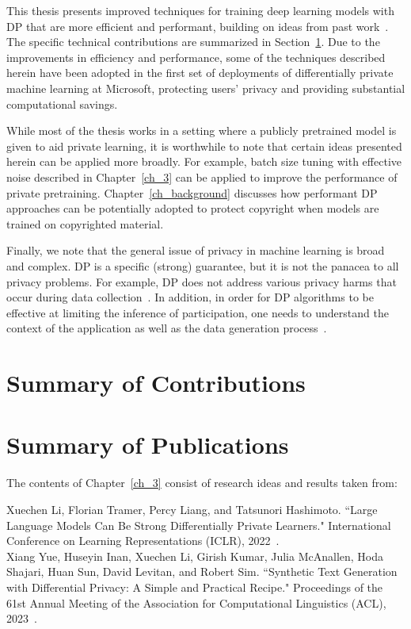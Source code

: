 This thesis presents improved techniques for training deep learning models with DP that are more efficient and performant, building on ideas from past work~\cite{abadi2016deep,tramer2020differentially}.
The specific technical contributions are summarized in Section~\ref{sec:overview_of_results}.
Due to the improvements in efficiency and performance, some of the techniques described herein have been adopted in the first set of deployments of differentially private machine learning at Microsoft, protecting users' privacy and providing substantial computational savings.

While most of the thesis works in a setting where a publicly pretrained model is given to aid private learning, it is worthwhile to note that certain ideas presented herein can be applied more broadly. 
For example, batch size tuning with effective noise described in Chapter~\ref{ch_3} can be applied to improve the performance of private pretraining. 
Chapter~\ref{ch_background} discusses how performant DP approaches can be potentially adopted to protect copyright when models are trained on copyrighted material.

Finally, we note that the general issue of privacy in machine learning is broad and complex.
DP is a specific (strong) guarantee, but it is not the panacea to all privacy problems.
For example, DP does not address various privacy harms that occur during data collection~\cite{solove2005taxonomy}.
In addition, in order for DP algorithms to be effective at limiting the inference of participation, one needs to understand the context of the application as well as the data generation process~\cite{kifer2011no}.

\section{Summary of Contributions}\label{sec:overview_of_results}

\newpage
\section{Summary of Publications}

\noindent The contents of Chapter~\ref{ch_3} consist of research ideas and results taken from:

\begin{mdframed}[leftline=true, topline=false, rightline=false, bottomline=false, linewidth=2pt]
Xuechen Li, Florian Tramer, Percy Liang, and Tatsunori Hashimoto. ``Large Language Models Can Be Strong Differentially Private Learners." International Conference on Learning Representations (ICLR), 2022~\cite{li2022large}.\\

\noindent Xiang Yue, Huseyin Inan, Xuechen Li, Girish Kumar, Julia McAnallen, Hoda Shajari, Huan Sun, David Levitan, and Robert Sim. ``Synthetic Text Generation with Differential Privacy: A Simple and Practical Recipe." Proceedings of the 61st Annual Meeting of the Association for Computational Linguistics (ACL), 2023~\cite{yue-etal-2023-synthetic}.
\end{mdframed}

